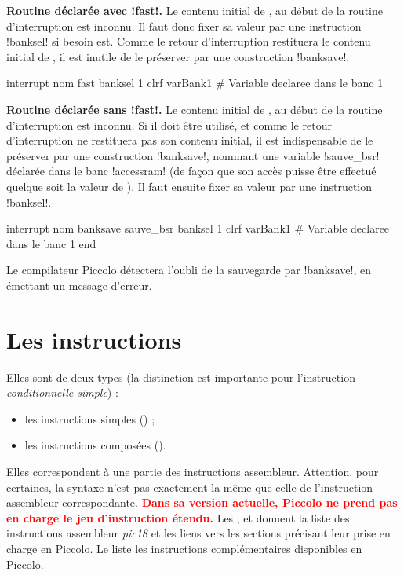 \textbf{Routine déclarée avec \pic!fast!.} Le contenu initial de , au début de la routine d’interruption est inconnu. Il faut donc fixer sa valeur par une instruction \pic!banksel! si besoin est. Comme le retour d’interruption restituera le contenu initial de , il est inutile de le préserver par une construction \pic!banksave!.

\begin{piccolo}
interrupt nom fast {
  banksel 1
  clrf varBank1 #  Variable declaree dans le banc 1
}
\end{piccolo}

\textbf{Routine déclarée sans \pic!fast!.} Le contenu initial de , au début de la routine d’interruption est inconnu. Si il doit être utilisé, et comme le retour d’interruption ne restituera pas son contenu initial, il est indispensable de le préserver par une construction \pic!banksave!, nommant une variable \pic!sauve_bsr! déclarée dans le banc \pic!accessram! (de façon que son accès puisse être effectué quelque soit la valeur de ). Il faut ensuite fixer sa valeur par une instruction \pic!banksel!. 

\begin{piccolo}
interrupt nom {
  banksave sauve_bsr
    banksel 1
    clrf varBank1 #  Variable declaree dans le banc 1
  end
}
\end{piccolo}

Le compilateur Piccolo détectera l’oubli de la sauvegarde par \pic!banksave!, en émettant un message d’erreur.


\section{Les instructions}

Elles sont de deux types (la distinction est importante pour l’instruction \emph{conditionnelle simple}) :
\begin{itemize}
  \item les instructions simples () ;
  \item les instructions composées ().

\end{itemize}



Elles correspondent à une partie des instructions assembleur. Attention, pour certaines, la syntaxe n'est pas exactement la même que celle de l'instruction assembleur correspondante. \textcolor{red}{\bf Dans sa version actuelle, Piccolo ne prend pas en charge le jeu d'instruction étendu.} Les ,   et  donnent la liste des instructions assembleur \emph{pic18} et les liens vers les sections précisant leur prise en charge en Piccolo. Le  liste les instructions complémentaires disponibles en Piccolo.

